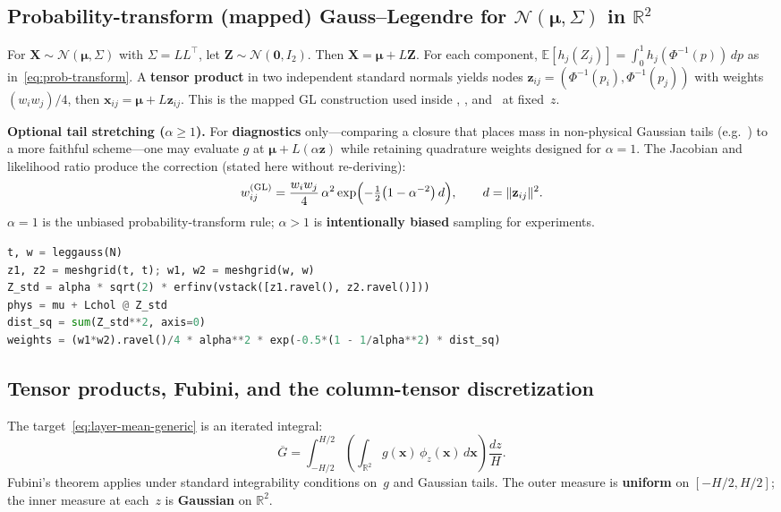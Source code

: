 \documentclass[11pt,a4paper]{article}
\begin{document}
\subsection{\texorpdfstring{Probability-transform (mapped) Gauss--Legendre for $\mathcal{N}(\boldsymbol{\mu},\Sigma)$ in $\mathbb{R}^2$}{Mapped Gauss--Legendre for bivariate normal}}
For $\mathbf{X}\sim\mathcal{N}(\boldsymbol{\mu},\Sigma)$ with $\Sigma=LL^\top$, let $\mathbf{Z}\sim\mathcal{N}(\mathbf{0},I_2)$.
Then $\mathbf{X}=\boldsymbol{\mu}+L\mathbf{Z}$.
For each component, $\mathbb{E}[h_j(Z_j)]=\int_0^1 h_j(\Phi^{-1}(p))\,dp$ as in~\eqref{eq:prob-transform}.
A \textbf{tensor product} in two independent standard normals yields nodes $\mathbf{z}_{ij}=(\Phi^{-1}(p_i),\Phi^{-1}(p_j))$ with weights $(w_i w_j)/4$, then $\mathbf{x}_{ij}=\boldsymbol{\mu}+L\mathbf{z}_{ij}$.
This is the mapped GL construction used inside \centeronly, \momentmatched, and \columntensor\ at fixed~$z$.

\textbf{Optional tail stretching ($\alpha\ge 1$).}
For \textbf{diagnostics} only---comparing a closure that places mass in non-physical Gaussian tails (e.g.\ \momentmatched) to a more faithful scheme---one may evaluate $g$ at $\boldsymbol{\mu}+L(\alpha\mathbf{z})$ while retaining quadrature weights designed for $\alpha=1$.
The Jacobian and likelihood ratio produce the correction (stated here without re-deriving):
\begin{equation}
  w_{ij}^{\mathrm{(GL)}} = \frac{w_i w_j}{4}\,\alpha^2 \exp\Bigl(-\tfrac12\bigl(1-\alpha^{-2}\bigr)\,d\Bigr),\qquad d=\|\mathbf{z}_{ij}\|^2.
\end{equation}
$\alpha=1$ is the unbiased probability-transform rule; $\alpha>1$ is \textbf{intentionally biased} sampling for experiments.

\begin{lstlisting}[language=Python]
t, w = leggauss(N)
z1, z2 = meshgrid(t, t); w1, w2 = meshgrid(w, w)
Z_std = alpha * sqrt(2) * erfinv(vstack([z1.ravel(), z2.ravel()]))
phys = mu + Lchol @ Z_std
dist_sq = sum(Z_std**2, axis=0)
weights = (w1*w2).ravel()/4 * alpha**2 * exp(-0.5*(1 - 1/alpha**2) * dist_sq)
\end{lstlisting}

\subsection{Tensor products, Fubini, and the column-tensor discretization}
\label{sec:m3-derive}
The target~\eqref{eq:layer-mean-generic} is an iterated integral:
\[
  \overline{G}=\int_{-H/2}^{H/2}\left(\int_{\mathbb{R}^2} g(\mathbf{x})\,\phi_z(\mathbf{x})\,d\mathbf{x}\right)\frac{dz}{H}.
\]
Fubini's theorem applies under standard integrability conditions on~$g$ and Gaussian tails.
The outer measure is \textbf{uniform} on $[-H/2,H/2]$; the inner measure at each~$z$ is \textbf{Gaussian} on $\mathbb{R}^2$.
\end{document}
